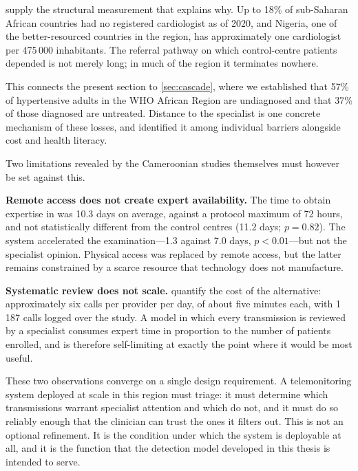 \documentclass[12pt,a4paper,oneside]{report}
\begin{document}
\Textcite{segun2025} supply the structural measurement that explains why. Up to 18\% of sub-Saharan African countries had no registered cardiologist as of 2020, and Nigeria, one of the better-resourced countries in the region, has approximately one cardiologist per 475\,000 inhabitants. The referral pathway on which control-centre patients depended is not merely long; in much of the region it terminates nowhere.

This connects the present section to \cref{sec:cascade}, where we established that 57\% of hypertensive adults in the WHO African Region are undiagnosed and that 37\% of those diagnosed are untreated. Distance to the specialist is one concrete mechanism of these losses, and \textcite{gafane2025} identified it among individual barriers alongside cost and health literacy.

Two limitations revealed by the Cameroonian studies themselves must however be set against this.

\textbf{Remote access does not create expert availability.} The time to obtain expertise in \textcite{bediang2021} was 10.3 days on average, against a protocol maximum of 72 hours, and not statistically different from the control centres (11.2 days; $p=0.82$). The system accelerated the examination---1.3 against 7.0 days, $p<0.01$---but not the specialist opinion. Physical access was replaced by remote access, but the latter remains constrained by a scarce resource that technology does not manufacture.

\textbf{Systematic review does not scale.} \Textcite{kingue2013} quantify the cost of the alternative: approximately six calls per provider per day, of about five minutes each, with 1\,187 calls logged over the study. A model in which every transmission is reviewed by a specialist consumes expert time in proportion to the number of patients enrolled, and is therefore self-limiting at exactly the point where it would be most useful.

These two observations converge on a single design requirement. A telemonitoring system deployed at scale in this region must triage: it must determine which transmissions warrant specialist attention and which do not, and it must do so reliably enough that the clinician can trust the ones it filters out. This is not an optional refinement. It is the condition under which the system is deployable at all, and it is the function that the detection model developed in this thesis is intended to serve.

\end{document}
